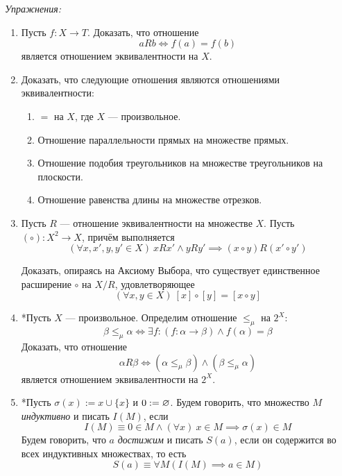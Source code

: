 \vspace{1em}
{\it Упражнения:}
\begin{enumerate}
  \item{}Пусть $f:X\to T$. Доказать, что отношение\label{ex:fn_equiv}
  \[
    aRb\iff f(a)=f(b)
  \]
  является отношением эквивалентности на $X$.

  \item{}Доказать, что следующие отношения являются отношениями эквивалентности:
  \begin{enumerate}
    \item{}$=$ на $X$, где $X$ --- произвольное.
    \item{}Отношение параллельности прямых на множестве прямых.
    \item{}Отношение подобия треугольников на множестве треугольников
    на плоскости.
    \item{}Отношение равенства длины на множестве отрезков.
  \end{enumerate}

  \item{}Пусть $R$ --- отношение эквивалентности на множестве $X$.
  Пусть $(\circ):X^{2}\to X$, причём выполняется
  \[
    (\forall x,x',y,y'\in X)~xRx'\land yRy'\implies (x\circ y)R(x'\circ y')
  \]

  Доказать, опираясь на Аксиому Выбора,
  что существует единственное расширение $\circ$ на $X/R$, удовлетворяющее
  \[
    (\forall x,y\in X)~[x]\circ[y]=[x\circ y]
  \]

  \item{}*Пусть $X$ --- произвольное.
  Определим отношение $\leq_{\mu}$ на $2^{X}$:
  \[
    \beta\leq_{\mu}\alpha\iff \exists f:(f:\alpha\to\beta)\land f(\alpha)=\beta
  \]
  Доказать, что отношение
  \[
    \alpha R\beta\iff (\alpha\leq_{\mu}\beta)\land (\beta\leq_{\mu}\alpha)
  \]
  является отношением эквивалентности на $2^{X}$.

  \item{}*Пусть $\sigma(x):=x\cup\{x\}$ и $0:=\varnothing$. Будем говорить, что
  множество $M$ {\it индуктивно} и писать $I(M)$, если
  \[
    I(M)\equiv 0\in M\land (\forall x)~x\in M\implies \sigma(x)\in M
  \]
  Будем говорить, что $a$ {\it достижим} и писать $S(a)$,
  если он содержится во всех индуктивных множествах, то есть
  \[
    S(a)\equiv \forall M(I(M)\implies a\in M)
  \]


\end{enumerate}
